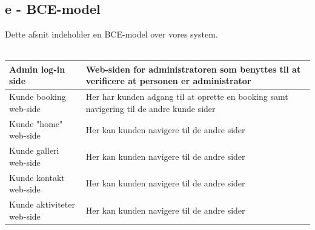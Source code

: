 \documentclass[12pt,a4paper]{article}
\begin{document}
\subsection{e - BCE-model}
Dette afsnit indeholder en BCE-model over vores system.\\\\
\begin{minipage}{\textwidth}

 \label{tab:title}
\begin{tabular}{| p{5cm} | p{10cm} |}
\hline Admin log-in side & Web-siden for administratoren som benyttes til at verificere at personen er administrator \\
\hline Kunde booking web-side & Her har kunden adgang til at oprette en booking samt navigering til de andre kunde sider \\
\hline Kunde "home" web-side & Her kan kunden navigere til de andre sider \\
\hline Kunde galleri web-side & Her kan kunden navigere til de andre sider \\
\hline Kunde kontakt web-side & Her kan kunden navigere til de andre sider \\
\hline Kunde aktiviteter web-side & Her kan kunden navigere til de andre sider \\
\hline
\end{tabular}

\end{minipage}

\bigskip
\end{document}
